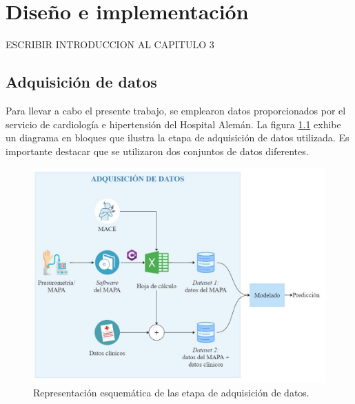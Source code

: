 \chapter{Diseño e implementación} %

\label{Chapter3} %

ESCRIBIR INTRODUCCION AL CAPITULO 3

\section{Adquisición de datos}
 
\newcommand{\myhash}{\raisebox{\depth}{\#}}

Para llevar a cabo el presente trabajo, se emplearon datos proporcionados por el servicio 
de cardiología e hipertensión del Hospital Alemán. La figura \ref{fig:adquisicion_datos} 
exhibe un diagrama en bloques que ilustra la etapa de adquisición de datos utilizada. 
Es importante destacar que se utilizaron dos conjuntos de datos diferentes. 

\begin{figure}[ht]
	\centering
	\includegraphics[width=\textwidth]{./Figures/adquisicion_datos2.jpg}
	\caption{Representación esquemática de las etapa de adquisición de datos.}\label{fig:adquisicion_datos}
\end{figure}

